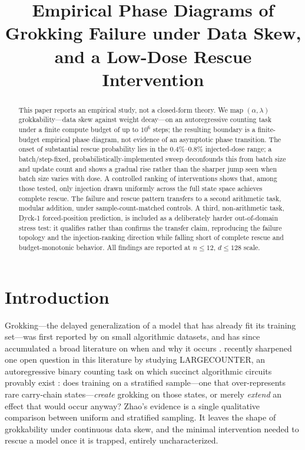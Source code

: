 \documentclass[11pt]{article}
\title{Empirical Phase Diagrams of Grokking Failure under Data Skew, and a Low-Dose Rescue Intervention}
\author{}
\date{}
\begin{document}
\maketitle

\begin{abstract}
This paper reports an empirical study, not a closed-form theory. We map $(\alpha, \lambda)$ grokkability---data skew against weight decay---on an autoregressive counting task under a finite compute budget of up to $10^6$ steps; the resulting boundary is a finite-budget empirical phase diagram, not evidence of an asymptotic phase transition. The onset of substantial rescue probability lies in the $0.4\%$--$0.8\%$ injected-dose range; a batch/step-fixed, probabilistically-implemented sweep deconfounds this from batch size and update count and shows a gradual rise rather than the sharper jump seen when batch size varies with dose. A controlled ranking of interventions shows that, among those tested, only injection drawn uniformly across the full state space achieves complete rescue. The failure and rescue pattern transfers to a second arithmetic task, modular addition, under sample-count-matched controls. A third, non-arithmetic task, Dyck-1 forced-position prediction, is included as a deliberately harder out-of-domain stress test: it qualifies rather than confirms the transfer claim, reproducing the failure topology and the injection-ranking direction while falling short of complete rescue and budget-monotonic behavior. All findings are reported at $n\le 12$, $d\le 128$ scale.
\end{abstract}

\section{Introduction}

Grokking---the delayed generalization of a model that has already fit its training set---was first reported by \citet{power2022grokking} on small algorithmic datasets, and has since accumulated a broad literature on when and why it occurs \citep{liu2022effectivetheory,liu2022omnigrok,nanda2023progress}. \citet{zhao2026grok} recently sharpened one open question in this literature by studying LARGECOUNTER, an autoregressive binary counting task on which succinct algorithmic circuits provably exist \citep{bergstrasser2026succinct}: does training on a stratified sample---one that over-represents rare carry-chain states---\emph{create} grokking on those states, or merely \emph{extend} an effect that would occur anyway? Zhao's evidence is a single qualitative comparison between uniform and stratified sampling. It leaves the shape of grokkability under continuous data skew, and the minimal intervention needed to rescue a model once it is trapped, entirely uncharacterized.
\end{document}
